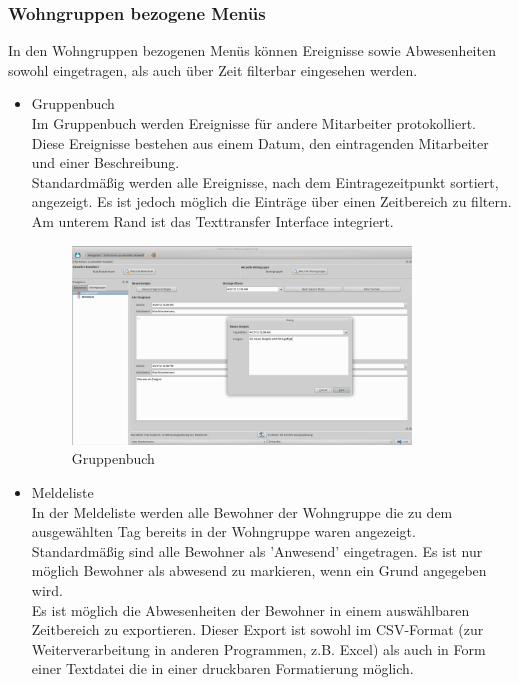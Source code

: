 \subsubsection{Wohngruppen bezogene Menüs}
In den Wohngruppen bezogenen Menüs können Ereignisse sowie Abwesenheiten sowohl eingetragen, als auch über Zeit filterbar eingesehen werden.
\begin{itemize}
	\item Gruppenbuch\mbox{}\\
	\noindent
	Im Gruppenbuch werden Ereignisse für andere Mitarbeiter protokolliert. Diese Ereignisse bestehen aus einem Datum, den eintragenden Mitarbeiter und einer Beschreibung.\\Standardmäßig werden alle Ereignisse, nach dem Eintragezeitpunkt sortiert, angezeigt. Es ist jedoch möglich die Einträge über einen Zeitbereich zu filtern.\\Am unterem Rand ist das Texttransfer Interface integriert.
	\begin{figure}[h]
		\begin{center}
			\includegraphics[keepaspectratio=true, width=0.85\textwidth]{pics/client_ereignis.png}
			\caption{Gruppenbuch}
		\end{center}
	\end{figure}
	\FloatBarrier
	\newpage
	\item Meldeliste\mbox{}\\
	\noindent
	In der Meldeliste werden alle Bewohner der Wohngruppe die zu dem ausgewählten Tag bereits in der Wohngruppe waren angezeigt. Standardmäßig sind alle Bewohner als 'Anwesend' eingetragen. Es ist nur möglich Bewohner als abwesend zu markieren, wenn ein Grund angegeben wird.\\Es ist möglich die Abwesenheiten der Bewohner in einem auswählbaren Zeitbereich zu exportieren. Dieser Export ist sowohl im CSV-Format (zur Weiterverarbeitung in anderen Programmen, z.B. Excel) als auch in Form einer Textdatei die in einer druckbaren Formatierung möglich.

\end{itemize}
